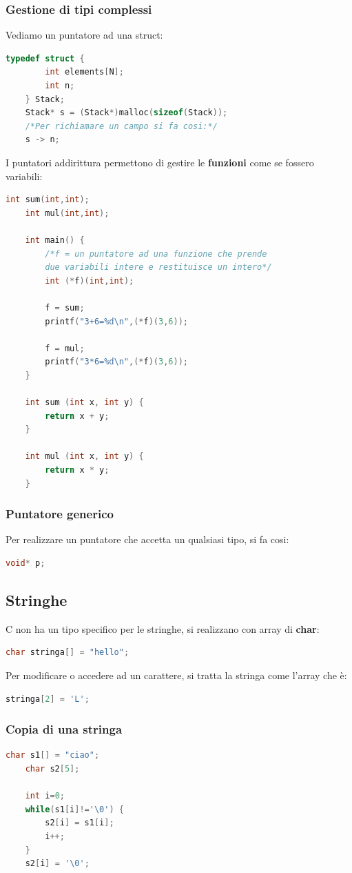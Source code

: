 \documentclass[12pt,a4paper]{article}
\begin{document}
\subsubsection{Gestione di tipi complessi}
Vediamo un puntatore ad una struct:
\begin{lstlisting}[language=C]
    typedef struct {
        int elements[N];
        int n;
    } Stack;
    Stack* s = (Stack*)malloc(sizeof(Stack));
    /*Per richiamare un campo si fa cosi:*/
    s -> n;
\end{lstlisting}
I puntatori addirittura permettono di gestire le \textbf{funzioni} come se fossero variabili:
\begin{lstlisting}[language=C]
    int sum(int,int);
    int mul(int,int);

    int main() {
        /*f = un puntatore ad una funzione che prende
        due variabili intere e restituisce un intero*/
        int (*f)(int,int);

        f = sum;
        printf("3+6=%d\n",(*f)(3,6));

        f = mul;
        printf("3*6=%d\n",(*f)(3,6));
    }

    int sum (int x, int y) {
        return x + y;
    }

    int mul (int x, int y) {
        return x * y;
    }
\end{lstlisting}
\subsubsection{Puntatore generico}
Per realizzare un puntatore che accetta un qualsiasi tipo, si fa cosi:
\begin{lstlisting}[language=C]
    void* p;
\end{lstlisting}

\subsection{Stringhe}
C non ha un tipo specifico per le stringhe, si realizzano con array di \textbf{char}:
\begin{lstlisting}[language=C]
    char stringa[] = "hello";
\end{lstlisting}
Per modificare o accedere ad un carattere, si tratta la stringa come l'array che è:
\begin{lstlisting}[language=C]
    stringa[2] = 'L';
\end{lstlisting}
\subsubsection{Copia di una stringa}
\begin{lstlisting}[language=C]
    char s1[] = "ciao";
    char s2[5];

    int i=0;
    while(s1[i]!='\0') {
        s2[i] = s1[i];
        i++;
    }
    s2[i] = '\0';
\end{lstlisting}
\end{document}
